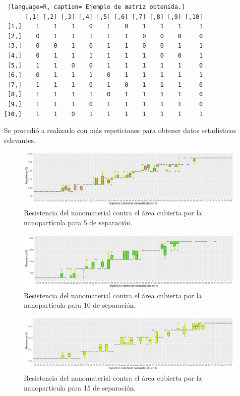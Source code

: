 \documentclass{elsarticle}
\begin{document}
\begin{lstlisting} [language=R, caption= Ejemplo de matriz obtenida.] 
      [,1] [,2] [,3] [,4] [,5] [,6] [,7] [,8] [,9] [,10]
 [1,]    1    1    1    0    1    0    1    1    1     1
 [2,]    0    1    1    1    1    1    0    0    0     0
 [3,]    0    0    1    0    1    1    0    0    1     1
 [4,]    0    1    1    1    1    1    1    0    0     1
 [5,]    1    1    0    0    1    1    1    1    1     0
 [6,]    0    1    1    1    0    1    1    1    1     1
 [7,]    1    1    1    0    1    0    1    1    1     0
 [8,]    1    1    1    1    0    1    1    1    1     0
 [9,]    1    1    1    0    1    1    1    1    1     0
[10,]    1    1    0    1    1    1    1    1    1     1
\end{lstlisting}

Se procedió a realizarlo con más repeticiones para obtener datos estadísticos relevantes.
\newpage
\begin{figure} [h!]%
\renewcommand{\figurename}{Gráfica}
    \centering
    \caption{ Resistencia del nanomaterial contra el área cubierta por la nanopartícula para 5 de separación.}
    \label{grafica2}
    \includegraphics[width=120mm]{grafica2.png} %
\end{figure}

\begin{figure} [h!]%
\renewcommand{\figurename}{Gráfica}
    \centering
    \caption{ Resistencia del nanomaterial contra el área cubierta por la nanopartícula para 10 de separación.}
    \label{grafica3}
    \includegraphics[width=120mm]{grafica3.png} %
\end{figure}

\begin{figure} [h!]%
\renewcommand{\figurename}{Gráfica}
    \centering
    \caption{ Resistencia del nanomaterial contra el área cubierta por la nanopartícula para 15 de separación.}
    \label{grafica4}
    \includegraphics[width=120mm]{grafica4.png} %
\end{figure}
\end{document}
